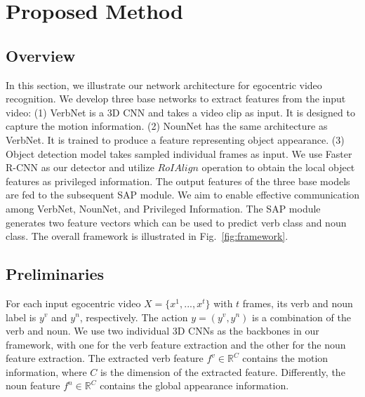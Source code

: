 \documentclass[letterpaper]{article} \usepackage{aaai20}  \usepackage{times}  \usepackage{helvet} \usepackage{courier}  \usepackage[hyphens]{url}  \usepackage{graphicx} \urlstyle{rm} \def\UrlFont{\rm}  \usepackage{graphicx}  \frenchspacing  \setlength{\pdfpagewidth}{8.5in}  \setlength{\pdfpageheight}{11in}  \usepackage{amsfonts,amssymb}
\begin{document}
\section{Proposed Method}

\subsection{Overview}
In this section, we illustrate our network architecture for egocentric video recognition. We develop three base networks to extract features from the input video: 
(1) VerbNet is a 3D CNN and takes a video clip as input. It is designed to capture the motion information. 
(2) NounNet has the same architecture as VerbNet. It is trained to produce a feature representing object appearance. 
(3) Object detection model takes sampled individual frames as input. We use Faster R-CNN as our detector and utilize $RoIAlign$ operation to obtain the local object features as privileged information. The output features of the three base models are fed to the subsequent SAP module. We aim to enable effective communication among VerbNet, NounNet, and Privileged Information. The SAP module generates two feature vectors which can be used to predict verb class and noun class. The overall framework is illustrated in Fig.~\ref{fig:framework}.


\subsection{Preliminaries}
For each input egocentric video ${X} = \{x^1,...,x^t\}$ with $t$ frames,
its verb and noun label is $y^v$ and $y^n$, respectively.
The action $y=(y^v, y^n)$ is a combination of the verb and noun. 
We use two individual 3D CNNs as the backbones in our framework, with one for the verb feature extraction and the other for the noun feature extraction.
The extracted verb feature ${f^v} \in \mathbb{R}^C$ contains the motion information, where $C$ is the dimension of the extracted feature. Differently, the noun feature ${f^n} \in \mathbb{R}^C$ contains the global appearance information.
\end{document}
